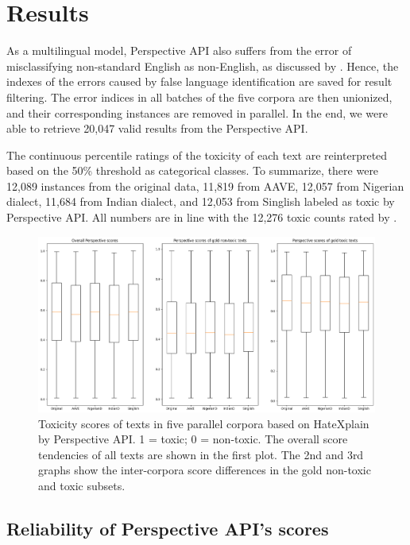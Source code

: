 \documentclass[11pt]{article}
\begin{document}
\section{Results}

As a multilingual model, Perspective API also suffers from the error of misclassifying non-standard English as non-English, as discussed by \citet{davidson-etal-2019-racial}. Hence, the indexes of the errors caused by false language identification are saved for result filtering. The error indices in all batches of the five corpora are then unionized, and their corresponding instances are removed in parallel. In the end, we were able to retrieve 20,047 valid results from the Perspective API.

The continuous percentile ratings of the toxicity of each text are reinterpreted based on the 50\% threshold as categorical classes. To summarize, there were 12,089 instances from the original data, 11,819 from AAVE, 12,057 from Nigerian dialect, 11,684 from Indian dialect, and 12,053 from Singlish labeled as toxic by Perspective API. All numbers are in line with the 12,276 toxic counts rated by \citet{mathew-2021-hatexplain}.

\begin{figure}[t]
  \includegraphics[width=1.0\linewidth]{figs-misc/all-scores.png}
  \caption{Toxicity scores of texts in five parallel corpora based on HateXplain by Perspective API. 1 = toxic; 0 = non-toxic. The overall score tendencies of all texts are shown in the first plot. The 2nd and 3rd graphs show the inter-corpora score differences in the gold non-toxic and toxic subsets.}
  \label{all-scores}
\end{figure}

\subsection{Reliability of Perspective API's scores}
\end{document}

